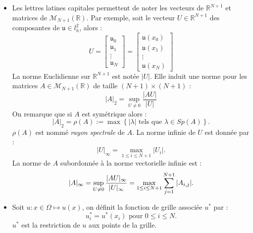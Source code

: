 \begin{itemize}
\item Les lettres latines capitales permettent de noter les vecteurs de $\mathbb{R}^{N+1}$ et matrices de $\mathcal{M}_{N+1}(\mathbb{R})$. Par exemple, soit le vecteur $U \in \mathbb{R}^{N+1}$ des composantes de $\mathfrak{u} \in l^2_h$, alors :
\begin{equation}
U = \begin{bmatrix}
\mathfrak{u}_0 \\ \mathfrak{u}_1 \\ \vdots \\ \mathfrak{u}_N
\end{bmatrix} =
\begin{bmatrix}
\mathfrak{u}(x_0) \\ \mathfrak{u}(x_1) \\ \vdots \\ \mathfrak{u}(x_N)
\end{bmatrix}
\end{equation}
La norme Euclidienne sur $\mathbb{R}^{N+1}$ est notée $|U|$. Elle induit une norme pour les matrices $A \in \mathcal{M}_{N+1}(\mathbb{R})$ de taille $(N+1) \times (N+1)$ :
\begin{equation}
|A|_2 = \sup_{U \neq 0} \dfrac{|AU|}{|U|}
\end{equation}
On remarque que si $A$ est symétrique alors :
\begin{equation}
|A|_2 = \rho(A) := \max \left\lbrace |\lambda| \text{ tels que } \lambda \in Sp(A) \right\rbrace.
\end{equation}
$\rho(A)$ est nommé \textit{rayon spectrale} de $A$.
La norme infinie de $U$ est donnée par :
\begin{equation}
|U|_{\infty} = \max_{1 \leq i \leq N+1} |U_i|.
\end{equation}
La norme de $A$ subordonnée à la norme vectorielle infinie est :
\begin{equation}
|A|_{\infty} = \sup_{U \neq 0} \dfrac{|AU|_{\infty}}{|U|_{\infty}} = \max_{1 \leq i \leq N+1} \displaystyle\sum\limits_{j=1}^{N+1} |A_{i,j}|.
\end{equation}

\item Soit $u: x \in \Omega \mapsto u(x)$, on définit la fonction de grille associée $u^*$ par :
\begin{equation}
u^*_i = u^*(x_i) \text{ pour } 0 \leq i \leq N.
\end{equation}
$u^*$ est la restriction de $u$ aux points de la grille.
\end{itemize}

